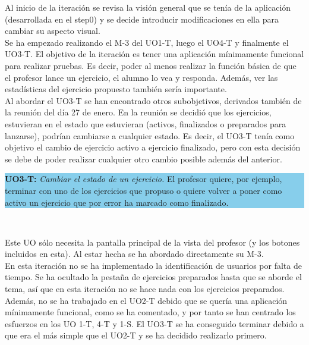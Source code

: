 Al inicio de la iteración se revisa la visión general que se tenía de la aplicación (desarrollada en el step0) y se decide introducir modificaciones en ella para cambiar su aspecto visual.\\

Se ha empezado realizando el M-3 del UO1-T, luego el UO4-T y finalmente el UO3-T. El objetivo de la iteración es tener una aplicación mínimamente funcional para realizar pruebas. Es decir, poder al menos realizar la función básica de que el profesor lance un ejercicio, el alumno lo vea y responda. Además, ver las estadísticas del ejercicio propuesto también sería importante.\\

Al abordar el UO3-T se han encontrado otros subobjetivos, derivados también de la reunión del día 27 de enero. En la reunión se decidió que los ejercicios, estuvieran en el estado que estuvieran (activos, finalizados o preparados para lanzarse), podrían cambiarse a cualquier estado. Es decir, el UO3-T tenía como objetivo el cambio de ejercicio activo a ejercicio finalizado, pero con esta decisión se debe de poder realizar cualquier otro cambio posible además del anterior.\\

\vspace{0.1cm}

\colorbox{SkyBlue}{\parbox[c]{1.0\textwidth}{
\textbf{UO3-T:} \textit{Cambiar el estado de un ejercicio.} El profesor quiere, por ejemplo, terminar con uno de los ejercicios que propuso o quiere volver a poner como activo un ejercicio que por error ha marcado como finalizado.\\
}}\\

\vspace{0.1cm}

Este UO sólo necesita la pantalla principal de la vista del profesor (y los botones incluidos en esta). Al estar hecha se ha abordado directamente su M-3.\\

En esta iteración no se ha implementado la identificación de usuarios por falta de tiempo. Se ha ocultado la pestaña de ejercicios preparados hasta que se aborde el tema, así que en esta iteración no se hace nada con los ejercicios preparados. Además, no se ha trabajado en el UO2-T debido que se quería una aplicación mínimamente funcional, como se ha comentado, y por tanto se han centrado los esfuerzos en los UO 1-T, 4-T y 1-S. El UO3-T se ha conseguido terminar debido a que era el más simple que el UO2-T y se ha decidido realizarlo primero.\\

